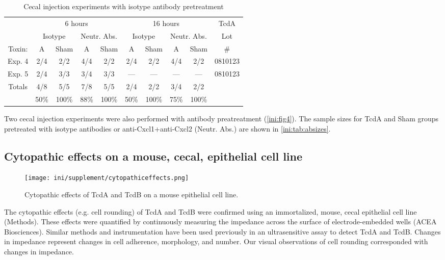 \begin{table}[ht]
\centering
\begin{tabular}{ c | c c | c c | c c | c c | c }
   & \multicolumn{4}{c|}{6 hours} & \multicolumn{4}{c|}{16 hours} & TcdA  \\
   & \multicolumn{2}{c|}{Isotype} & \multicolumn{2}{c|}{Neutr. Abs.} &
     \multicolumn{2}{c|}{Isotype} & \multicolumn{2}{c|}{Neutr. Abs.} & Lot \\
   Toxin: & A & Sham & A & Sham & A & Sham & A & Sham & \# \\ \hline
   Exp. 4 & 2/4 & 2/2 & 4/4 & 2/2 & 2/4 & 2/2 & 4/4 & 2/2 & 0810123 \\
   Exp. 5 & 2/4 & 3/3 & 3/4 & 3/3 & --- & --- & --- & --- & 0810123 \\ \hline
   Totals & 4/8 & 5/5 & 7/8 & 5/5 & 2/4 & 2/2 & 3/4 & 2/2 &  \\
    & 50\% & 100\% & 88\% & 100\% & 50\% & 100\% & 75\% & 100\% &  \\
\end{tabular}
\caption{Cecal injection experiments with isotype antibody pretreatment}
\label{ini:tab:absizes}
\end{table}   

Two cecal injection experiments were also performed with antibody 
preatreatment (\autoref{ini:fig4}). The sample sizes for TcdA and Sham
groups pretreated with isotype antibodies or anti-Cxcl1+anti-Cxcl2 (Neutr. Abs.) 
are shown in \autoref{ini:tab:absizes}.

\subsection{Cytopathic effects on a mouse, cecal, epithelial cell line}

\begin{figure}[b!]
\centering
\texttt{[image: ini/supplement/cytopathiceffects.png]}
\caption{Cytopathic effects of TcdA and TcdB on a mouse epithelial cell line.}
\label{ini:fig:cells}
\end{figure}

The cytopathic effects (e.g. cell rounding) of TcdA and TcdB were confirmed using an
immortalized, mouse, cecal epithelial cell line (Methods). These effects
were quantified by continuously measuring the impedance across the surface
of electrode-embedded wells (ACEA Biosciences). Similar methods and instrumentation
have been used previously in an ultrasensitive assay to detect TcdA and TcdB. \autocite{He2009}
Changes in impedance represent changes in
cell adherence, morphology, and number. Our visual observations of cell rounding
corresponded with changes in impedance. 

